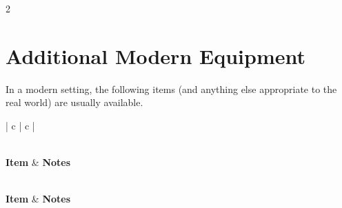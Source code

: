 \begin{multicols}{2}

\chapter{Additional Modern Equipment}

In a modern setting, the following items (and anything else appropriate to the real world) are usually available.

\end{multicols}

\begin{longtable}{| c | c |}
\caption{Modern Equipment}
\label{tab:Modern Equipment} \\
\hline
\textbf{Item} & \textbf{Notes} \\
\hline
\endfirsthead 

\hline
{} \\
\hline
\textbf{Item} & \textbf{Notes} \\
\hline
\endhead

\hline
{} \\
\hline
\endfoot

\hline
\endlastfoot


\end{longtable}
